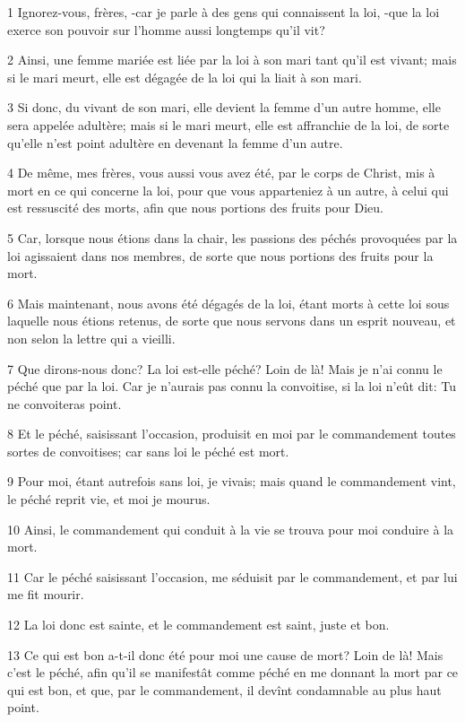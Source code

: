 \par 1 Ignorez-vous, frères, -car je parle à des gens qui connaissent la loi, -que la loi exerce son pouvoir sur l'homme aussi longtemps qu'il vit?
\par 2 Ainsi, une femme mariée est liée par la loi à son mari tant qu'il est vivant; mais si le mari meurt, elle est dégagée de la loi qui la liait à son mari.
\par 3 Si donc, du vivant de son mari, elle devient la femme d'un autre homme, elle sera appelée adultère; mais si le mari meurt, elle est affranchie de la loi, de sorte qu'elle n'est point adultère en devenant la femme d'un autre.
\par 4 De même, mes frères, vous aussi vous avez été, par le corps de Christ, mis à mort en ce qui concerne la loi, pour que vous apparteniez à un autre, à celui qui est ressuscité des morts, afin que nous portions des fruits pour Dieu.
\par 5 Car, lorsque nous étions dans la chair, les passions des péchés provoquées par la loi agissaient dans nos membres, de sorte que nous portions des fruits pour la mort.
\par 6 Mais maintenant, nous avons été dégagés de la loi, étant morts à cette loi sous laquelle nous étions retenus, de sorte que nous servons dans un esprit nouveau, et non selon la lettre qui a vieilli.
\par 7 Que dirons-nous donc? La loi est-elle péché? Loin de là! Mais je n'ai connu le péché que par la loi. Car je n'aurais pas connu la convoitise, si la loi n'eût dit: Tu ne convoiteras point.
\par 8 Et le péché, saisissant l'occasion, produisit en moi par le commandement toutes sortes de convoitises; car sans loi le péché est mort.
\par 9 Pour moi, étant autrefois sans loi, je vivais; mais quand le commandement vint, le péché reprit vie, et moi je mourus.
\par 10 Ainsi, le commandement qui conduit à la vie se trouva pour moi conduire à la mort.
\par 11 Car le péché saisissant l'occasion, me séduisit par le commandement, et par lui me fit mourir.
\par 12 La loi donc est sainte, et le commandement est saint, juste et bon.
\par 13 Ce qui est bon a-t-il donc été pour moi une cause de mort? Loin de là! Mais c'est le péché, afin qu'il se manifestât comme péché en me donnant la mort par ce qui est bon, et que, par le commandement, il devînt condamnable au plus haut point.
